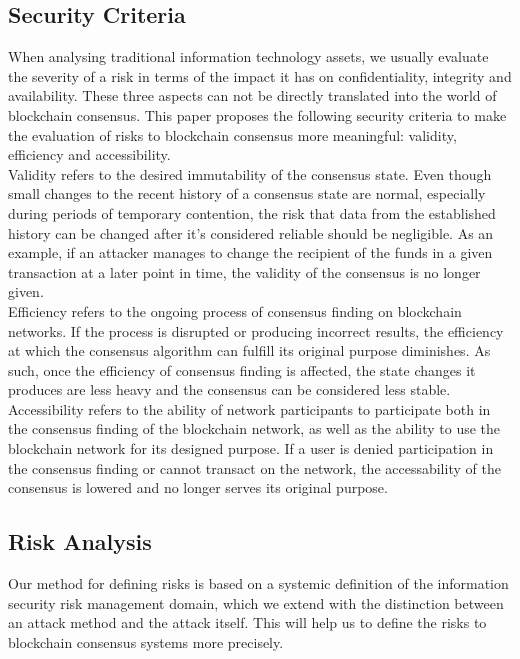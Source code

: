 \documentclass[11pt,a4paper,draft]{article}
\begin{document}
\subsection{Security Criteria}

When analysing traditional information technology assets, we usually evaluate the severity of a risk in terms of the impact it has on confidentiality, integrity and availability. These three aspects can not be directly translated into the world of blockchain consensus. This paper proposes the following security criteria to make the evaluation of risks to blockchain consensus more meaningful: validity, efficiency and accessibility.\\

Validity refers to the desired immutability of the consensus state. Even though small changes to the recent history of a consensus state are normal, especially during periods of temporary contention, the risk that data from the established history can be changed after it's considered reliable should be negligible. As an example, if an attacker manages to change the recipient of the funds in a given transaction at a later point in time, the validity of the consensus is no longer given.\\

Efficiency refers to the ongoing process of consensus finding on blockchain networks. If the process is disrupted or producing incorrect results, the efficiency at which the consensus algorithm can fulfill its original purpose diminishes. As such, once the efficiency of consensus finding is affected, the state changes it produces are less heavy and the consensus can be considered less stable.\\

Accessibility refers to the ability of network participants to participate both in the consensus finding of the blockchain network, as well as the ability to use the blockchain network for its designed purpose. If a user is denied participation in the consensus finding or cannot transact on the network, the accessability of the consensus is lowered and no longer serves its original purpose.\\

\subsection{Risk Analysis}

Our method for defining risks is based on a systemic definition of the information security risk management domain, which we extend with the distinction between an attack method and the attack itself. This will help us to define the risks to blockchain consensus systems more precisely.\\
\end{document}
